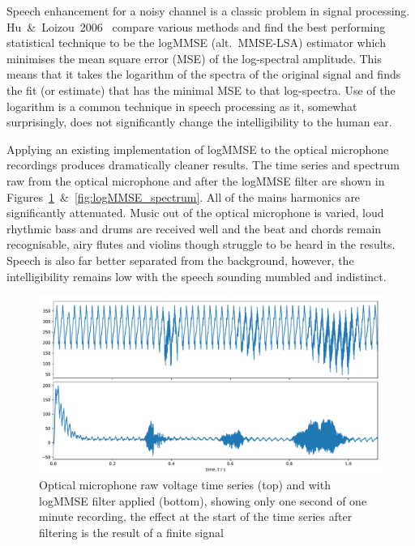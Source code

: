 \documentclass[prb,preprint]{revtex4-1}
\begin{document}
Speech enhancement for a noisy channel is a classic problem in signal processing. Hu~\&~Loizou~2006~\cite{SubjectiveComparison} compare various methods and find the best performing statistical technique to be the logMMSE (alt.\ MMSE-LSA) estimator which minimises the mean square error (MSE) of the log-spectral amplitude. This means that it takes the logarithm of the spectra of the original signal and finds the fit (or estimate) that has the minimal MSE to that log-spectra. Use of the logarithm is a common technique in speech processing as it, somewhat surprisingly, does not significantly change the intelligibility to the human ear.


Applying an existing implementation of logMMSE to the optical microphone recordings produces dramatically cleaner results. The time series and spectrum raw from the optical microphone and after the logMMSE filter are shown in Figures~\ref{fig:logMMSE_timeseries}~\&~\ref{fig:logMMSE_spectrum}. All of the mains harmonics are significantly attenuated. Music out of the optical microphone is varied, loud rhythmic bass and drums are received well and the beat and chords remain recognisable, airy flutes and violins though struggle to be heard in the results. Speech is also far better separated from the background, however, the intelligibility remains low with the speech sounding mumbled and indistinct.

\begin{figure}%
	\includegraphics[width=\textwidth]{filter_timeseries_aa_melatos-cropped.pdf}
	\caption{Optical microphone raw voltage time series (top) and with logMMSE filter applied (bottom), showing only one second of one minute recording, the effect at the start of the time series after filtering is the result of a finite signal}
	\label{fig:logMMSE_timeseries}
\end{figure}
\end{document}
